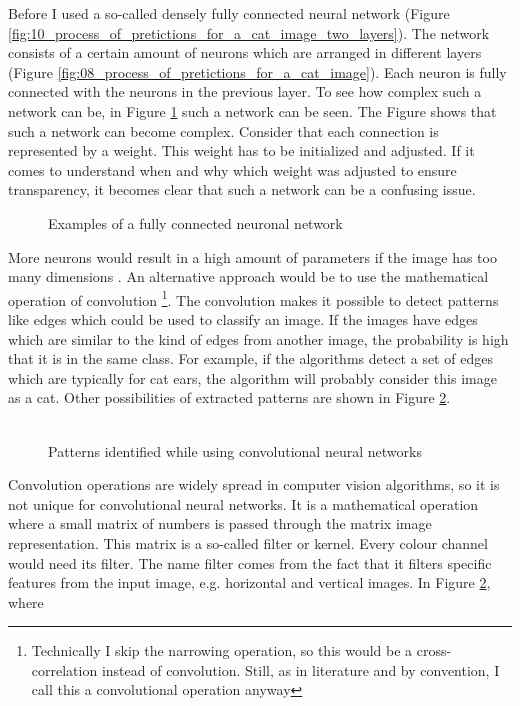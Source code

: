 Before I used a so-called densely fully connected neural network (Figure \ref{fig:10_process_of_pretictions_for_a_cat_image_two_layers}). The network consists of a certain amount of neurons which are arranged in different layers (Figure \ref{fig:08_process_of_pretictions_for_a_cat_image}). Each neuron is fully connected with the neurons in the previous layer. To see how complex such a network can be,  in Figure \ref{fig:signs} such a network can be seen. The Figure shows that such a network can become complex. Consider that each connection is represented by a weight. This weight has to be initialized and adjusted. If it comes to understand when and why which weight was adjusted to ensure transparency, it becomes clear that such a network can be a confusing issue. 

\begin{figure}[htp]
	\centering
	\caption{Examples of a fully connected neuronal network}
	\label{fig:signs}
\end{figure}

More neurons would result in a high amount of parameters if the image has too many dimensions \cite[p. 324]{Goodfellow-et-al-2016}. An alternative approach would be to use the mathematical operation of convolution \footnote{Technically I skip the narrowing operation, so this would be a cross-correlation instead of convolution. Still, as in literature and by convention, I call this a convolutional operation anyway\cite{AndrewNG}}. The convolution makes it possible to detect patterns like edges which could be used to classify an image. If the images have edges which are similar to the kind of edges from another image, the probability is high that it is in the same class. For example, if the algorithms detect a set of edges which are typically for cat ears, the algorithm will probably consider this image as a cat. Other possibilities of extracted patterns are shown in Figure \ref{fig:edge_detec}.\\\\
\begin{figure}[htp]
	\centering
	\caption{Patterns identified while using convolutional neural networks \cite{SimpleIn5:online}}
	\label{fig:edge_detec}
\end{figure}

Convolution operations are widely spread in computer vision algorithms, so it is not unique for convolutional neural networks. It is a mathematical operation where a small matrix of numbers is passed through the matrix image representation. This matrix is a so-called filter or kernel. Every colour channel would need its filter. The name filter comes from the fact that it filters specific features from the input image, e.g. horizontal and vertical images. In Figure \ref{fig:edge_detec}, where

